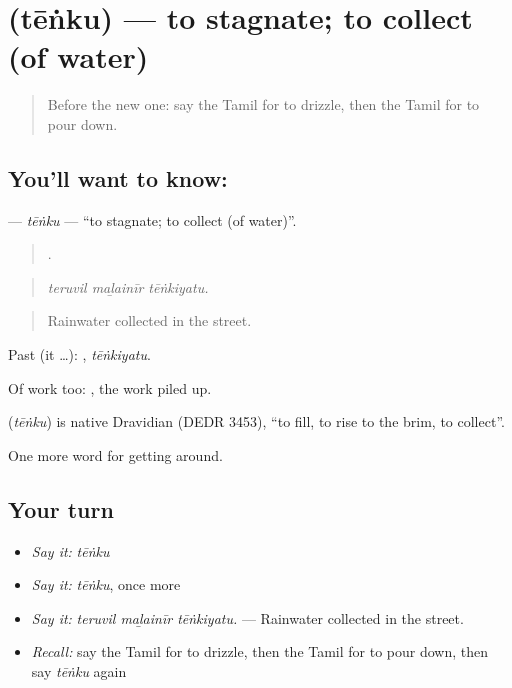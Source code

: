 \section[\texorpdfstring{\ta{தேங்கு} (tēṅku)}{தேங்கு (tēṅku)}]{ (tēṅku) — to stagnate; to collect (of water)}

\label{lesson:TA-C428-tenku}



\begin{quote}
Before the new one: say the Tamil for to drizzle, then the Tamil for to pour down.
\end{quote}

\subsection*{You'll want to know: }
\textbf{} — \emph{tēṅku} — \textquotedblleft{}to stagnate; to collect (of water)\textquotedblright{}.

\begin{quote}
  .
\end{quote}

\begin{quote}
\emph{teruvil maḻainīr tēṅkiyatu.}
\end{quote}

\begin{quote}
Rainwater collected in the street.
\end{quote}

Past (it …): , \emph{tēṅkiyatu}.

Of work too:  , the work piled up.

\begin{cousinweb}
\textbf{} (\emph{tēṅku}) is native Dravidian (DEDR 3453), \textquotedblleft{}to fill, to rise to the brim, to collect\textquotedblright{}.
\end{cousinweb}

\begin{grammarlens}[title={What you've built}]
One more word for getting around.
\end{grammarlens}

\subsection*{Your turn}
\begin{itemize}
\raggedright
  \item \emph{Say it:} \emph{tēṅku}
  \item \emph{Say it:} \emph{tēṅku}, once more
  \item \emph{Say it:} \emph{teruvil maḻainīr tēṅkiyatu.} — Rainwater collected in the street.
  \item \emph{Recall:} say the Tamil for to drizzle, then the Tamil for to pour down, then say \emph{tēṅku} again
\end{itemize}

